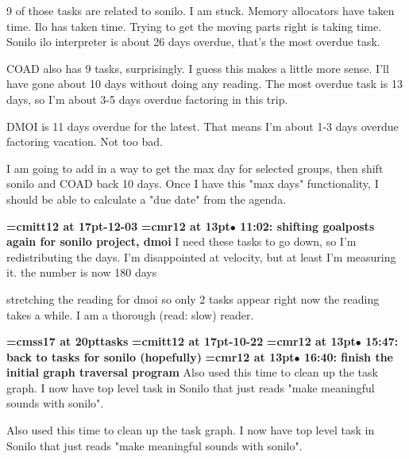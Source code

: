 9 of those tasks are related to sonilo. I am stuck. Memory allocators have taken time. Ilo has taken time. Trying to get the moving parts right is taking time. Sonilo ilo interpreter is about 26 days overdue, that's the most overdue task.
\par

COAD also has 9 tasks, surprisingly. I guess this makes a little more sense. I'll have gone about 10 days without doing any reading. The most overdue task is 13 days, so I'm about 3-5 days overdue factoring in this trip.
\par

DMOI is 11 days overdue for the latest. That means I'm about 1-3 days overdue factoring vacation. Not too bad.
\par

I am going to add in a way to get the max day for selected groups, then shift sonilo and COAD back 10 days. Once I have this "max days" functionality, I should be able to calculate a "due date" from the agenda.
\par

{\medskip\noindent\bf\font\titlefont=cmitt12 at 17pt-12-03}\medskip
{\smallskip\noindent\bf\font\titlefont=cmr12 at 13pt\titlefont $\bullet$ 11:02: shifting goalposts again for sonilo project, dmoi}\smallskip
I need these tasks to go down, so I'm redistributing the days. I'm disappointed at velocity, but at least I'm measuring it. the number is now 180 days
\par

stretching the reading for dmoi so only 2 tasks appear right now the reading takes a while. I am a thorough (read: slow) reader.
\par

{\medskip\noindent\bf\font\titlefont=cmss17 at 20pt\titlefont tasks}\medskip
{\medskip\noindent\bf\font\titlefont=cmitt12 at 17pt-10-22}\medskip
{\smallskip\noindent\bf\font\titlefont=cmr12 at 13pt\titlefont $\bullet$ 15:47: back to tasks for sonilo (hopefully)}\smallskip
{\smallskip\noindent\bf\font\titlefont=cmr12 at 13pt\titlefont $\bullet$ 16:40: finish the initial graph traversal program}\smallskip
Also used this time to clean up the task graph. I now have top level task in Sonilo that just reads "make meaningful sounds with sonilo".
\par

Also used this time to clean up the task graph. I now have top level task in Sonilo that just reads "make meaningful sounds with sonilo".
\par

